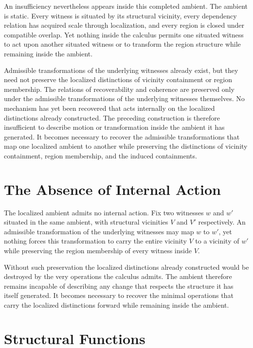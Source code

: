 \documentclass[12pt,anyside]{book}
\begin{document}
An insufficiency nevertheless appears inside this completed ambient. The ambient is static. Every witness is situated by its structural vicinity, every dependency relation has acquired scale through localization, and every region is closed under compatible overlap. Yet nothing inside the calculus permits one situated witness to act upon another situated witness or to transform the region structure while remaining inside the ambient. 

Admissible transformations of the underlying witnesses already exist, but they need not preserve the localized distinctions of vicinity containment or region membership. The relations of recoverability and coherence are preserved only under the admissible transformations of the underlying witnesses themselves. No mechanism has yet been recovered that acts internally on the localized distinctions already constructed. The preceding construction is therefore insufficient to describe motion or transformation inside the ambient it has generated. It becomes necessary to recover the admissible transformations that map one localized ambient to another while preserving the distinctions of vicinity containment, region membership, and the induced containments.

\section{The Absence of Internal Action}
The localized ambient admits no internal action. Fix two witnesses $w$ and $w'$ situated in the same ambient, with structural vicinities $V$ and $V'$ respectively. An admissible transformation of the underlying witnesses may map $w$ to $w'$, yet nothing forces this transformation to carry the entire vicinity $V$ to a vicinity of $w'$ while preserving the region membership of every witness inside $V$. 

Without such preservation the localized distinctions already constructed would be destroyed by the very operations the calculus admits. The ambient therefore remains incapable of describing any change that respects the structure it has itself generated. It becomes necessary to recover the minimal operations that carry the localized distinctions forward while remaining inside the ambient.

\section{Structural Functions}
\end{document}
